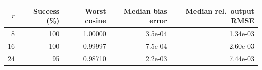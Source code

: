 \begin{tabular}{r r r r r}
\toprule
$r$ & Success (\%) & Worst cosine & Median bias error & Median rel.\ output RMSE\\
\midrule
8 & 100 & 1.00000 & 3.5e-04 & 1.34e-03 \\
16 & 100 & 0.99997 & 7.5e-04 & 2.60e-03 \\
24 & 95 & 0.98710 & 2.2e-03 & 7.44e-03 \\
\bottomrule
\end{tabular}

